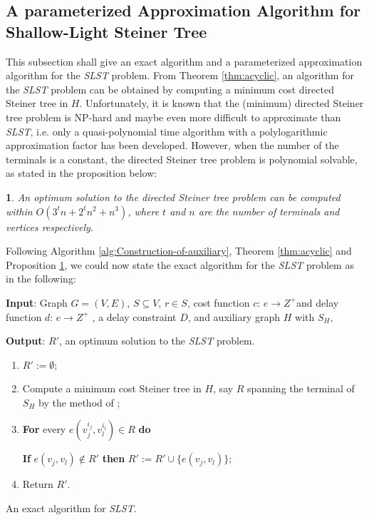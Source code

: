 \documentclass[english,runningheads,a4paper]{llncs}
\newtheorem{prop}[thm]{\protect\propositionname}
\providecommand{\propositionname}{Proposition}
\begin{document}
\subsection{A parameterized Approximation Algorithm for Shallow-Light Steiner
Tree }

This subsection shall give an exact algorithm and a parameterized
approximation algorithm for the \emph{SLST} problem. From Theorem
\ref{thm:acyclic}, an algorithm for the \emph{SLST} problem can be
obtained by computing a minimum cost directed Steiner tree in $H$.
Unfortunately, it is known that the (minimum) directed Steiner tree
problem is NP-hard and maybe even more difficult to approximate than
\emph{SLST}, i.e. only a quasi-polynomial time algorithm with a polylogarithmic
approximation factor has been developed\cite{charikar1998approximation}.
However, when the number of the terminals is a constant, the directed
Steiner tree problem is polynomial solvable, as stated in the proposition
below:
\begin{prop}
\label{prop:An-optimum-solution}\cite{guo2011parameterized}An optimum
solution to the directed Steiner tree problem can be computed within
$O(3^{t}n+2^{t}n^{2}+n^{3})$, where $t$ and $n$ are the number
of terminals and vertices respectively.
\end{prop}
Following Algorithm \ref{alg:Construction-of-auxiliary}, Theorem
\ref{thm:acyclic} and Proposition \ref{prop:An-optimum-solution},
we could now state the exact algorithm for the \emph{SLST} problem
as in the following:

\begin{algorithm}
\textbf{Input}: Graph $G=(V,E)$, $S\subseteq V$, $r\in S$, cost
function $c:\, e\rightarrow Z^{+}$and delay function $d:\, e\rightarrow Z^{+}$
, a delay constraint $D$, and auxiliary graph $H$ with $S_{H}$,

\textbf{Output}: $R'$, an optimum solution to the \emph{SLST} problem.
\begin{enumerate}
\item $R':=\emptyset$;
\item Compute a minimum cost Steiner tree in $H$, say $R$ spanning the
terminal of $S_{H}$ by the method of \cite{ding2007finding};
\item \textbf{For} every $e(v_{j}^{i_{j}},v_{l}^{i_{l}})\in R$ \textbf{do}


\quad{}\textbf{If} $e(v_{j},v_{l})\notin R'$ \textbf{then} $R':=R'\cup\{e(v_{j},v_{l})\}$;

\item Return $R'$.
\end{enumerate}
\caption{\label{alg:An-exact-algorithm}An exact algorithm for \emph{SLST}.}


\end{algorithm}
\end{document}

